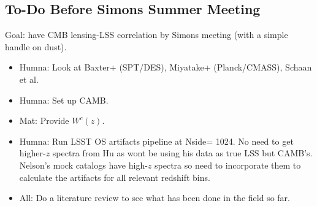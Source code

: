 \documentclass{article}
\begin{document}
{%
\subsection*{To-Do Before Simons Summer Meeting}
Goal: have CMB lensing-LSS correlation by Simons meeting (with a simple handle on dust).
\begin{itemize}
\item Humna: Look at Baxter+ (SPT/DES), Miyatake+ (Planck/CMASS), Schaan et al.
\item Humna: Set up CAMB.
\item Mat: Provide $W^c(z)$.
\item Humna: Run LSST OS artifacts pipeline at Nside= 1024. No need to get higher-$z$ spectra from Hu as wont be using his data as true LSS but CAMB's. Nelson's mock catalogs have high-$z$ spectra so need to incorporate them to calculate the artifacts for all relevant redshift bins.
\item All: Do a literature review to see what has been done in the field so far.
\end{itemize}









}
\end{document}
